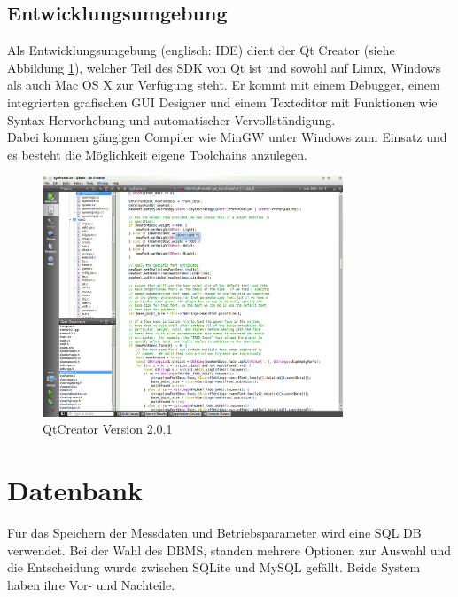 \subsection{Entwicklungsumgebung}
Als Entwicklungsumgebung (englisch: \ac{IDE}) dient der Qt Creator (siehe Abbildung \ref{QtCreator}), welcher Teil des \ac{SDK} von Qt ist und sowohl auf Linux, Windows als auch Mac OS X zur Verfügung steht. Er kommt mit einem Debugger, einem integrierten grafischen \ac{GUI} Designer und einem Texteditor mit Funktionen wie Syntax-Hervorhebung und automatischer Vervollständigung. \\
Dabei kommen gängigen Compiler wie MinGW unter Windows zum Einsatz und es besteht die Möglichkeit eigene Toolchains anzulegen. \\

\begin{figure}[h]
\begin{center}
\includegraphics[width=0.8\textwidth]{img/general/QtCreator.png}
\caption{QtCreator Version 2.0.1}
\label{QtCreator}
\end{center}
\end{figure}
\newpage


\section{Datenbank}
\label{section_Datenbank}

Für das Speichern der Messdaten und Betriebsparameter wird eine \ac{SQL} \ac{DB} verwendet. Bei der Wahl des \ac{DBMS}, standen mehrere Optionen zur Auswahl und die Entscheidung wurde zwischen SQLite und MySQL gefällt.
Beide System haben ihre Vor- und Nachteile.


